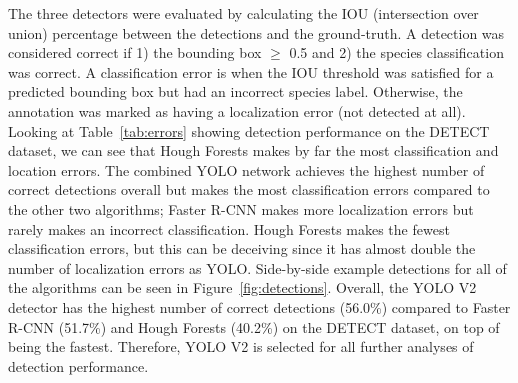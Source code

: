 The three detectors were evaluated by calculating the IOU (intersection over union) percentage between the detections and the ground-truth.  A detection was considered correct if 1) the bounding box  $\geq$ 0.5 and 2) the species classification was correct.  A classification error is when the IOU threshold was satisfied for a predicted bounding box but had an incorrect species label.  Otherwise, the annotation was marked as having a localization error (not detected at all).  Looking at Table~\ref{tab:errors} showing detection performance on the DETECT dataset, we can see that Hough Forests makes by far the most classification and location errors.  The combined YOLO network achieves the highest number of correct detections overall but makes the most classification errors compared to the other two algorithms; Faster R-CNN makes more localization errors but rarely makes an incorrect classification.  Hough Forests makes the fewest classification errors, but this can be deceiving since it has almost double the number of localization errors as YOLO.  Side-by-side example detections for all of the algorithms can be seen in Figure~\ref{fig:detections}.  Overall, the YOLO V2 detector has the highest number of correct detections (56.0\%) compared to Faster R-CNN (51.7\%) and Hough Forests (40.2\%) on the DETECT dataset, on top of being the fastest. Therefore, YOLO V2 is selected for all further analyses of detection performance.

